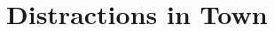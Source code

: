 \documentclass[a4paper,openany]{book}
\begin{document}


\begin{multicols}{2}











\end{multicols}

\section{Distractions in Town}


\renewcommand{\sqarea}{Town}

\begin{multicols}{2}





%





\end{multicols}

\backmatter

\printglossary[
  type=symbols,
  ]

\printindex
\end{document}
